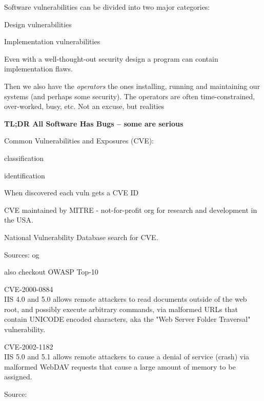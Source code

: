 \documentclass[Screen16to9,17pt]{foils}
\begin{document}
Software vulnerabilities can be divided into two major categories:
\begin{list2}
\item Design vulnerabilities
\item Implementation vulnerabilities
\end{list2}

Even with a well-thought-out security design a program can contain implementation flaws.

Then we also have the \emph{operators} the ones installing, running and maintaining our systems (and perhaps some security). The operators are often time-constrained, over-worked, busy, etc. Not an excuse, but realities

{\bf\Large TL;DR All Software Has Bugs -- some are serious}




\begin{list1}
\item Common Vulnerabilities and Exposures (CVE):
  \begin{list2}
  \item classification
  \item identification
  \end{list2}
\item When discovered each vuln gets a CVE ID
\item CVE maintained by MITRE - not-for-profit
org for research and development in the USA.
\item National Vulnerability Database search for CVE.
\item Sources:  og 
\item also checkout OWASP Top-10 
\end{list1}


\begin{list1}
\item \small CVE-2000-0884\\
IIS 4.0 and 5.0 allows remote attackers to read documents outside of
the web root, and possibly execute arbitrary commands, via malformed
URLs that contain UNICODE encoded characters, aka the "Web Server
Folder Traversal" vulnerability.

\item \small CVE-2002-1182\\
IIS 5.0 and 5.1 allows remote attackers to cause a denial of service
(crash) via malformed WebDAV requests that cause a large amount of
memory to be assigned.

\item Source:\\
\end{list1}
\end{document}
